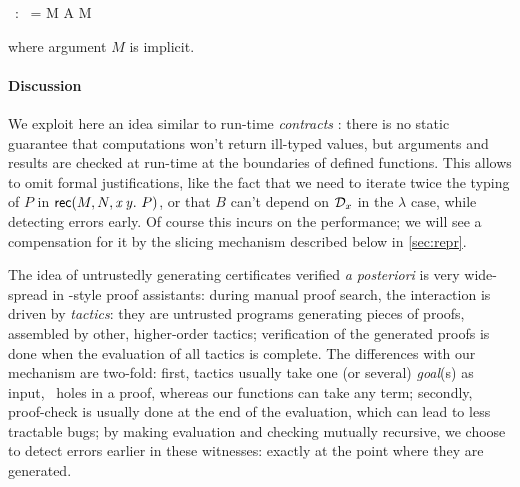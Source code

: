 \documentclass{llncs}
\begin{document}
\begin{mathleft}
  \fget{}\ :\     =
  \lamd M \lamd A \lamd \md M
\end{mathleft}

\noindent
where argument $M$ is implicit.

\paragraph{Discussion}

We exploit here an idea similar to run-time \emph{contracts}
\cite{wadler2009well}: there is no static guarantee that computations
won't return ill-typed values, but arguments and results are checked
at run-time at the boundaries of defined functions. This allows to
omit formal justifications, like the fact that we need to iterate
twice the typing of $P$ in $\text{\textsf{rec}}({M},{N},{\text{\textit{x}}}\,{\text{\textit{y}}}.\ {P})$, or that $B$ can't depend
on $\mathcal D_x$ in the $\lambda$ case, while detecting errors early. Of
course this incurs on the performance; we will see a compensation for
it by the slicing mechanism described below in \ref{sec:repr}.

The idea of untrustedly generating certificates verified \emph{a
  posteriori} is very wide-spread in -style proof
assistants: during manual proof search, the interaction is driven by
\emph{tactics}: %
they are untrusted programs generating pieces of proofs, assembled by
other, higher-order tactics; verification of the generated proofs is
done when the evaluation of all tactics is complete. The differences
with our mechanism are two-fold: first, tactics usually take one (or
several) \emph{goal}(s) as input, \ie\ holes in a proof, whereas our
functions can take any term; secondly, proof-check is usually done at
the end of the evaluation, which can lead to less tractable bugs; by
making evaluation and checking mutually recursive, we choose to detect
errors earlier in these witnesses: exactly at the point where they are
generated.
\end{document}
